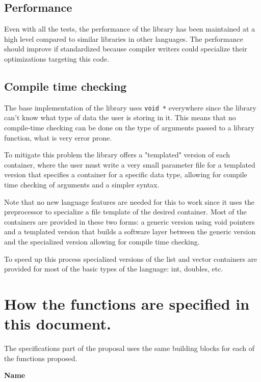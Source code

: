 \subsection{Performance} Even with all the tests, the performance of the library has been maintained at a high level compared to similar libraries
in other languages. The performance should improve if standardized because compiler writers could specialize their optimizations targeting this
code.
\subsection{Compile time checking}
The base implementation of the library uses \verb,void *, everywhere since the library can't know what type
of data the user is storing in it. This means that no compile-time checking can be done on the type of
arguments passed to a library function, what is very error prone.

To mitigate this problem the library offers a "templated" version of each container, where the user must
write a very small parameter file for a templated version that specifies a container for a specific data
type, allowing for compile time checking of arguments and a simpler syntax.

Note that no new language features are needed for this to work since it uses the preprocessor to specialize
a file template of the desired container. Most of the containers are provided in these two forms: a generic
version using void pointers and a templated version that builds a software layer between the generic version and
the specialized version allowing for compile time checking.

To speed up this process specialized versions of the list and vector containers are provided for most of the
basic types of the language: int, doubles, etc.
\section{How the functions are specified in this document.}
The specifications part of the proposal uses the same building blocks for each of the functions proposed.\par\noindent
\textbf{Name}

